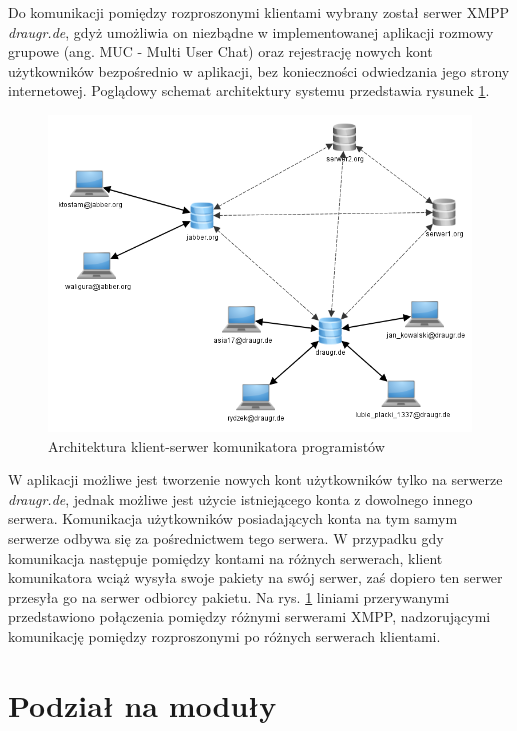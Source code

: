 \documentclass[polish,11pt,a4paper,twoside]{article}
\begin{document}
Do komunikacji pomiędzy rozproszonymi klientami wybrany został serwer XMPP \emph{draugr.de}, gdyż umożliwia on niezbądne w implementowanej aplikacji rozmowy grupowe (ang. MUC - Multi User Chat) oraz rejestrację nowych kont użytkowników bezpośrednio w aplikacji, bez konieczności odwiedzania jego strony internetowej. Poglądowy schemat architektury systemu przedstawia rysunek \ref{fig:architektura}.

\begin{figure}[!htb]
  \begin{center}
    \includegraphics[width=1.0\textwidth]{img/architektura.png}
    \caption{Architektura klient-serwer komunikatora programistów} \label{fig:architektura} 
  \end{center}
\end{figure}

W aplikacji możliwe jest tworzenie nowych kont użytkowników tylko na serwerze \emph{draugr.de}, jednak możliwe jest użycie istniejącego konta z dowolnego innego serwera. Komunikacja użytkowników posiadających konta na tym samym serwerze odbywa się za pośrednictwem tego serwera. W przypadku gdy komunikacja następuje pomiędzy kontami na różnych serwerach, klient komunikatora wciąż wysyła swoje pakiety na swój serwer, zaś dopiero ten serwer przesyła go na serwer odbiorcy pakietu. Na rys. \ref{fig:architektura} liniami przerywanymi przedstawiono połączenia pomiędzy różnymi serwerami XMPP, nadzorującymi komunikację pomiędzy rozproszonymi po różnych serwerach klientami.

\section{Podział na moduły}
\end{document}
